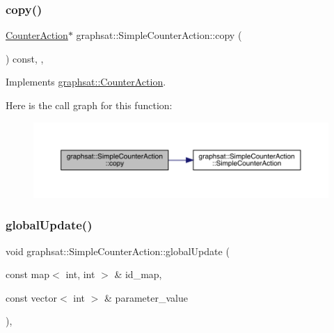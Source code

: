 \subsubsection{\texorpdfstring{copy()}{copy()}}
{\footnotesize\ttfamily \mbox{\hyperlink{classgraphsat_1_1_counter_action}{Counter\+Action}}$\ast$ graphsat\+::\+Simple\+Counter\+Action\+::copy (\begin{DoxyParamCaption}{ }\end{DoxyParamCaption}) const\hspace{0.3cm}{\ttfamily [inline]}, {\ttfamily [private]}, {\ttfamily [virtual]}}



Implements \mbox{\hyperlink{classgraphsat_1_1_counter_action_aa6ab6ebd8e13b466dba062efea962691}{graphsat\+::\+Counter\+Action}}.

Here is the call graph for this function\+:
\nopagebreak
\begin{figure}[H]
\begin{center}
\leavevmode
\includegraphics[width=350pt]{classgraphsat_1_1_simple_counter_action_ad84a740a65e18a992f10a606d7f74973_cgraph}
\end{center}
\end{figure}
\mbox{\label{classgraphsat_1_1_simple_counter_action_afec31087ec27170187d831e2de9a2aa4}} 
\subsubsection{\texorpdfstring{globalUpdate()}{globalUpdate()}}
{\footnotesize\ttfamily void graphsat\+::\+Simple\+Counter\+Action\+::global\+Update (\begin{DoxyParamCaption}\item[{const map$<$ int, int $>$ \&}]{id\+\_\+map,  }\item[{const vector$<$ int $>$ \&}]{parameter\+\_\+value }\end{DoxyParamCaption})\hspace{0.3cm}{\ttfamily [inline]}, {\ttfamily [virtual]}}


